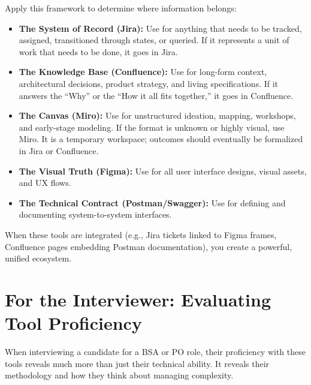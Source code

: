 \documentclass[
  11pt,
  openany,
  oneside]{book}
\providecommand{\tightlist}{%
  \setlength{\itemsep}{0pt}\setlength{\parskip}{0pt}}
\begin{document}
Apply this framework to determine where information belongs:

\begin{itemize}
\tightlist
\item
  \textbf{The System of Record (Jira):} Use for anything that needs to
  be tracked, assigned, transitioned through states, or queried. If it
  represents a unit of work that needs to be done, it goes in Jira.
\item
  \textbf{The Knowledge Base (Confluence):} Use for long-form context,
  architectural decisions, product strategy, and living specifications.
  If it answers the ``Why'' or the ``How it all fits together,'' it goes
  in Confluence.
\item
  \textbf{The Canvas (Miro):} Use for unstructured ideation, mapping,
  workshops, and early-stage modeling. If the format is unknown or
  highly visual, use Miro. It is a temporary workspace; outcomes should
  eventually be formalized in Jira or Confluence.
\item
  \textbf{The Visual Truth (Figma):} Use for all user interface designs,
  visual assets, and UX flows.
\item
  \textbf{The Technical Contract (Postman/Swagger):} Use for defining
  and documenting system-to-system interfaces.
\end{itemize}

When these tools are integrated (e.g., Jira tickets linked to Figma
frames, Confluence pages embedding Postman documentation), you create a
powerful, unified ecosystem.

\section{For the Interviewer: Evaluating Tool
Proficiency}\label{for-the-interviewer-evaluating-tool-proficiency}

When interviewing a candidate for a BSA or PO role, their proficiency
with these tools reveals much more than just their technical ability. It
reveals their methodology and how they think about managing complexity.
\end{document}
